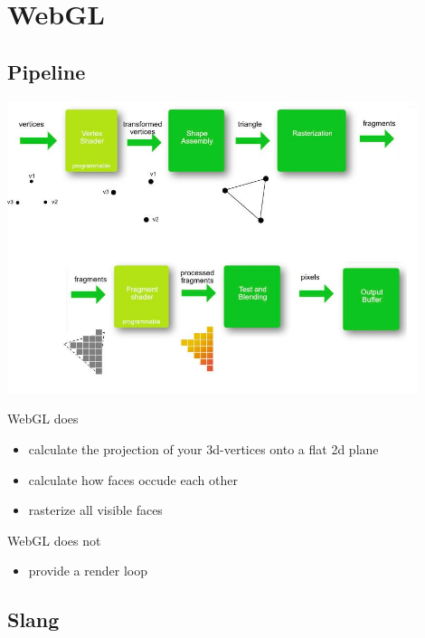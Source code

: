 \section{WebGL}

\subsection{Pipeline}
\includegraphics[width=0.9\textwidth]{images/graphicPipeline.jpg}

WebGL does
\begin{itemize}
    \item calculate the projection of your 3d-vertices onto a flat 2d plane
    \item calculate how faces occude each other
    \item rasterize all visible faces
\end{itemize}

WebGL does not 
\begin{itemize}
    \item provide a render loop
\end{itemize}

\subsection{Slang}

